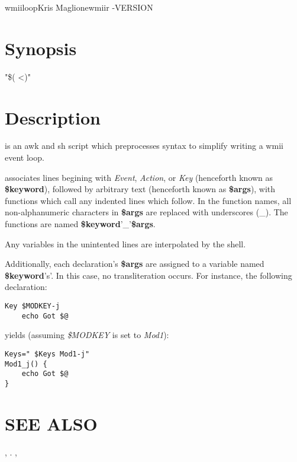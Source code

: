\begin{Name}{1}{wmiiloop}{Kris Maglione}{}{wmiir}
	-VERSION
\end{Name}

\section{Synopsis}
 "\$( <)"

\section{Description}

 is an awk and sh script which preprocesses  syntax
to simplify writing a wmii event loop.

 associates lines begining with \emph{Event}, \emph{Action}, or
\emph{Key} (henceforth known as \textbf{\$keyword}), followed by arbitrary
text (henceforth known as \textbf{\$args}), with functions which call any
indented lines which follow.  In the function names, all non-alphanumeric
characters in \textbf{\$args} are replaced with underscores (\_). The
functions are named \textbf{\$keyword}'_'\textbf{\$args}.

Any variables in the unintented lines are interpolated by the shell.

Additionally, each declaration's \textbf{\$args} are assigned to a variable
named \textbf{\$keyword}'s'. In this case, no transliteration occurs. For
instance, the following declaration:

\begin{verbatim}
Key $MODKEY-j
	echo Got $@
\end{verbatim}
yields (assuming \emph{\$MODKEY} is set to \emph{Mod1}):

\begin{verbatim}
Keys=" $Keys Mod1-j"
Mod1_j() {
	echo Got $@
}
\end{verbatim}

\section{SEE ALSO}
, . ,

